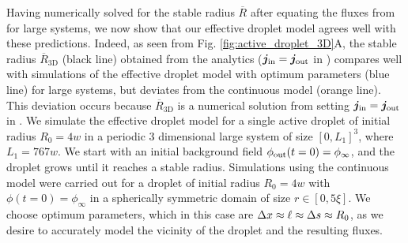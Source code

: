 Having numerically solved for the stable radius $\overline{R}$ after equating the fluxes from  for large systems, we now show that our effective droplet model agrees well with these predictions.
Indeed, as seen from Fig. \ref{fig:active_droplet_3D}A, the stable radius $\overline{R}_\mathrm{3D}$ (black line) obtained from the analytics ($\boldsymbol{j}_\mathrm{in} = \boldsymbol{j}_\mathrm{out}$ in ) compares well with simulations of the effective droplet model with optimum parameters (blue line) for large systems, but deviates from the continuous model (orange line).
This deviation occurs because $\overline{R}_\mathrm{3D}$ is a numerical solution from setting $\boldsymbol{j}_\mathrm{in} = \boldsymbol{j}_\mathrm{out}$ in .
We simulate the effective droplet model for a single active droplet of initial radius $R_0 = 4w$ in a periodic 3 dimensional large system of size $[0, L_1]^3$, where $L_1 = 767w$.
We start with an initial background field $\phi_\mathrm{out}(t=0) = \phi_\infty$, and the droplet grows until it reaches a stable radius.
Simulations using the continuous model were carried out for a droplet of initial radius $R_0 = 4w$ with $\phi(t=0) = \phi_\infty$ in a spherically symmetric domain of size $r \in [0, 5 \xi]$.
We choose optimum parameters, which in this case are $\Delta x \approx \ell \approx \Delta s \approx R_0$, as we desire to accurately model the vicinity of the droplet and the resulting fluxes.

